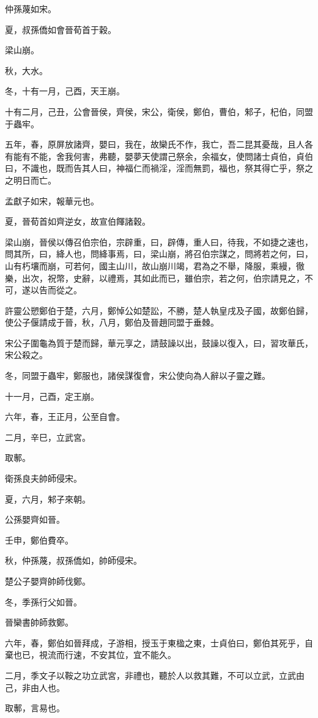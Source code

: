 \begin{pinyinscope}
仲孫蔑如宋。

夏，叔孫僑如會晉荀首于穀。

梁山崩。

秋，大水。

冬，十有一月，己酉，天王崩。

十有二月，己丑，公會晉侯，齊侯，宋公，衛侯，鄭伯，曹伯，邾子，杞伯，同盟于蟲牢。

五年，春，原屏放諸齊，嬰曰，我在，故欒氏不作，我亡，吾二昆其憂哉，且人各有能有不能，舍我何害，弗聽，嬰夢天使謂己祭余，余福女，使問諸士貞伯，貞伯曰，不識也，既而告其人曰，神福仁而禍淫，淫而無罰，福也，祭其得亡乎，祭之之明日而亡。

孟獻子如宋，報華元也。

夏，晉荀首如齊逆女，故宣伯餫諸穀。

梁山崩，晉侯以傳召伯宗伯，宗辟重，曰，辟傳，重人曰，待我，不如捷之速也，問其所，曰，絳人也，問絳事焉，曰，梁山崩，將召伯宗謀之，問將若之何，曰，山有朽壤而崩，可若何，國主山川，故山崩川竭，君為之不舉，降服，乘縵，徹樂，出次，祝幣，史辭，以禮焉，其如此而已，雖伯宗，若之何，伯宗請見之，不可，遂以告而從之。

許靈公愬鄭伯于楚，六月，鄭悼公如楚訟，不勝，楚人執皇戌及子國，故鄭伯歸，使公子偃請成于晉，秋，八月，鄭伯及晉趙同盟于垂棘。

宋公子圍龜為質于楚而歸，華元享之，請鼓譟以出，鼓譟以復入，曰，習攻華氏，宋公殺之。

冬，同盟于蟲牢，鄭服也，諸侯謀復會，宋公使向為人辭以子靈之難。

十一月，己酉，定王崩。

六年，春，王正月，公至自會。

二月，辛巳，立武宮。

取鄟。

衛孫良夫帥師侵宋。

夏，六月，邾子來朝。

公孫嬰齊如晉。

壬申，鄭伯費卒。

秋，仲孫蔑，叔孫僑如，帥師侵宋。

楚公子嬰齊帥師伐鄭。

冬，季孫行父如晉。

晉欒書帥師救鄭。

六年，春，鄭伯如晉拜成，子游相，授玉于東楹之東，士貞伯曰，鄭伯其死乎，自棄也已，視流而行速，不安其位，宜不能久。

二月，季文子以鞍之功立武宮，非禮也，聽於人以救其難，不可以立武，立武由己，非由人也。

取鄟，言易也。


\end{pinyinscope}

